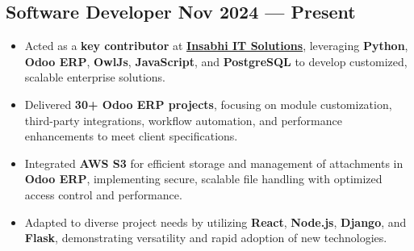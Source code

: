 \subsection{{Software Developer \hfill Nov 2024 --- Present}}

\vspace{0.1em}
{\color{black}
\begin{itemize}\itemsep 0.1em
  \item Acted as a \textbf{key contributor} at \textbf{\href{https://www.insabhi.com}{Insabhi IT Solutions}}, leveraging \textbf{Python}, \textbf{Odoo ERP}, \textbf{OwlJs}, \textbf{JavaScript}, and \textbf{PostgreSQL} to develop customized, scalable enterprise solutions.
  \item Delivered \textbf{30+ Odoo ERP projects}, focusing on module customization, third-party integrations, workflow automation, and performance enhancements to meet client specifications.
  \item Integrated \textbf{AWS S3} for efficient storage and management of attachments in \textbf{Odoo ERP}, implementing secure, scalable file handling with optimized access control and performance.
  \item Adapted to diverse project needs by utilizing \textbf{React}, \textbf{Node.js}, \textbf{Django}, and \textbf{Flask}, demonstrating versatility and rapid adoption of new technologies.
\end{itemize}
}
